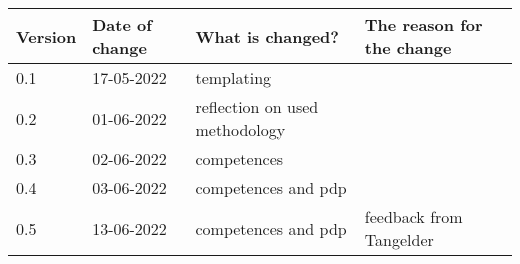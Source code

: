 \begin{tabular}{ | l | l | l | l |}
    \hline
    \textbf{Version} & \textbf{Date of change} & \textbf{What is changed?} & \textbf{The reason for the change} \\ \hline
    0.1 & 17-05-2022 & templating & \\
    0.2 & 01-06-2022 & reflection on used methodology & \\
    0.3 & 02-06-2022 & competences & \\
    0.4 & 03-06-2022 & competences and pdp & \\
    0.5 & 13-06-2022 & competences and pdp & feedback from Tangelder\\
    \hline
\end{tabular}